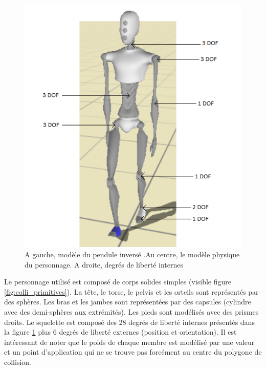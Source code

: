 \documentclass{llncs}
\begin{document}
\begin{figure}[h]
\includegraphics[scale=0.5]{img_dof.png}
\caption{A gauche, modèle du pendule inversé \cite{coros2010generalized}.Au centre, le modèle physique du personnage. A droite, degrés de liberté internes}
\label{fig:ipm}
\label{fig:colli_primitives}
\label{fig:dof}
\end{figure}

Le personnage utilisé est composé de corps solides simples (visible figure \ref{fig:colli_primitives}). La tête, le torse, le pelvis et les orteils sont représentés par des sphères. Les bras et les jambes sont représentées par des capsules (cylindre avec des demi-sphères aux extrémités). Les pieds sont modélisés avec des prismes droits. Le squelette est composé des 28 degrés de liberté internes présentés dans la figure \ref{fig:dof} plus 6 degrés de liberté externes (position et orientation). Il est intéressant de noter que le poids de chaque membre est modélisé par une valeur et un point d'application qui ne se trouve pas forcément au centre du polygone de collision.

%
\end{document}
